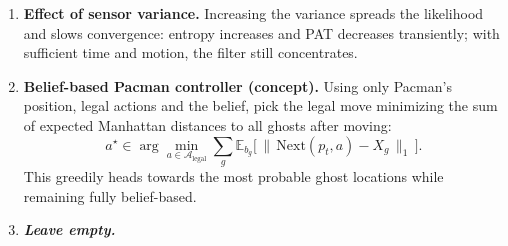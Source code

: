 \documentclass{article}
\begin{document}
\begin{enumerate}[label=\alph*.,leftmargin=*]
    \item \textbf{Effect of sensor variance.}
    Increasing the variance spreads the likelihood and slows convergence: entropy increases and PAT decreases transiently; with sufficient time and motion, the filter still concentrates.

    \item \textbf{Belief-based Pacman controller (concept).}
    Using only Pacman's position, legal actions and the belief, pick the legal move minimizing the sum of expected Manhattan distances to all ghosts after moving:
    \[
      a^\star \in \arg\min_{a\in \mathcal{A}_{\text{legal}}}
      \sum_{g} \mathbb{E}_{b_g}\!\big[\, \|\, \mathrm{Next}(p_t,a) - X_g \,\|_1 \,\big].
    \]
    This greedily heads towards the most probable ghost locations while remaining fully belief-based.
    
    \item \textbf{\textit{Leave empty.}}
\end{enumerate}

\end{document}
